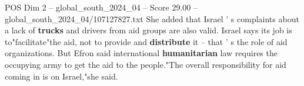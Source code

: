 \begin{textsample}{POS Dim 2 – global\_south\_2024\_04 – Score 29.00 – global\_south\_2024\_04/107127827.txt}
She added that Israel ' s complaints about a lack of \textbf{trucks} and drivers from aid groups are also valid.
Israel says its job is to"facilitate"the aid, not to provide and \textbf{distribute} it -- that ' s the role of aid organizations.
But Efron said international \textbf{humanitarian} law requires the occupying army to get the aid to the people."The overall responsibility for aid coming in is on Israel,"she said.

\end{textsample}
